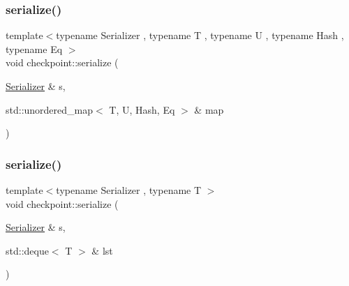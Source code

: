 \mbox{\label{namespacecheckpoint_a9fc2f3eb20d3ce8d6145e99a2559ea58}} 
\subsubsection{\texorpdfstring{serialize()}{serialize()}\hspace{0.1cm}{\footnotesize\ttfamily [22/29]}}
{\footnotesize\ttfamily template$<$typename Serializer , typename T , typename U , typename Hash , typename Eq $>$ \\
void checkpoint\+::serialize (\begin{DoxyParamCaption}\item[{\hyperlink{structcheckpoint_1_1_serializer}{Serializer} \&}]{s,  }\item[{std\+::unordered\+\_\+map$<$ T, U, Hash, Eq $>$ \&}]{map }\end{DoxyParamCaption})\hspace{0.3cm}{\ttfamily [inline]}}

\mbox{\label{namespacecheckpoint_a179b767294c9b23617f30fc4566d0be7}} 
\subsubsection{\texorpdfstring{serialize()}{serialize()}\hspace{0.1cm}{\footnotesize\ttfamily [23/29]}}
{\footnotesize\ttfamily template$<$typename Serializer , typename T $>$ \\
void checkpoint\+::serialize (\begin{DoxyParamCaption}\item[{\hyperlink{structcheckpoint_1_1_serializer}{Serializer} \&}]{s,  }\item[{std\+::deque$<$ T $>$ \&}]{lst }\end{DoxyParamCaption})\hspace{0.3cm}{\ttfamily [inline]}}

\mbox{\label{namespacecheckpoint_aa77eeb7a036d253ef33ed2c9ef764a5e}} 
